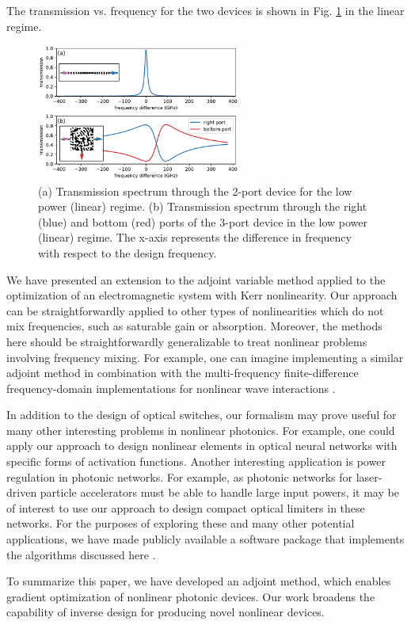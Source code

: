 The transmission vs. frequency for the two devices is shown in Fig. \ref{fig:spectra} in the linear regime.

\begin{figure}[h]
\centering
\includegraphics[width=0.6\textwidth]{figures/angler_spectra_11_2.pdf}
\caption{\label{fig:spectra} (a) Transmission spectrum through the 2-port device for the low power (linear) regime. (b) Transmission spectrum through the right (blue) and bottom (red) ports of the 3-port device in the low power (linear) regime.  The x-axis represents the difference in frequency with respect to the design frequency.}
\end{figure}

We have presented an extension to the adjoint variable method applied to the optimization of an electromagnetic system with Kerr nonlinearity. Our approach can be straightforwardly applied to other types of nonlinearities which do not mix frequencies, such as saturable gain or absorption. Moreover, the methods here should be straightforwardly generalizable to treat nonlinear problems involving frequency mixing. For example, one can imagine implementing a similar adjoint method in combination with the multi-frequency finite-difference frequency-domain implementations for nonlinear wave interactions \cite{Shi2016multi}. 

In addition to the design of optical switches, our formalism may prove useful for many other interesting problems in nonlinear photonics.  For example, one could apply our approach to design nonlinear elements in optical neural networks \cite{shen2017deep} with specific forms of activation functions.  Another interesting application is power regulation in photonic networks.  For example, as photonic networks for laser-driven particle accelerators \cite{hughes2018chip} must be able to handle large input powers, it may be of interest to use our approach to design compact optical limiters in these networks. For the purposes of exploring these and many other potential applications, we have made publicly available a software package that implements the algorithms discussed here \cite{hughes2018fdfdpy}.

To summarize this paper, we have developed an adjoint method, which enables gradient optimization of nonlinear photonic devices. Our work broadens the capability of inverse design for producing novel nonlinear devices. 
